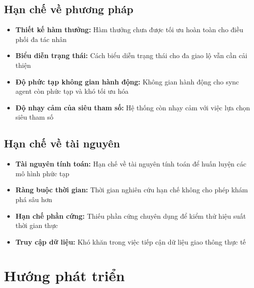 \subsection{Hạn chế về phương pháp}
\begin{itemize}
    \item \textbf{Thiết kế hàm thưởng:} Hàm thưởng chưa được tối ưu hoàn toàn
        cho điều phối đa tác nhân

    \item \textbf{Biểu diễn trạng thái:} Cách biểu diễn trạng thái cho đa giao lộ
        vẫn cần cải thiện

    \item \textbf{Độ phức tạp không gian hành động:} Không gian hành động cho sync agent còn phức
        tạp và khó tối ưu hóa

    \item \textbf{Độ nhạy cảm của siêu tham số:} Hệ thống còn nhạy cảm với việc
        lựa chọn siêu tham số
\end{itemize}

\subsection{Hạn chế về tài nguyên}
\begin{itemize}
    \item \textbf{Tài nguyên tính toán:} Hạn chế về tài nguyên tính toán để
        huấn luyện các mô hình phức tạp

    \item \textbf{Ràng buộc thời gian:} Thời gian nghiên cứu hạn chế không cho phép
        khám phá sâu hơn

    \item \textbf{Hạn chế phần cứng:} Thiếu phần cứng chuyên dụng để kiểm thử hiệu suất thời gian thực

    \item \textbf{Truy cập dữ liệu:} Khó khăn trong việc tiếp cận dữ liệu giao thông
        thực tế
\end{itemize}

\section{Hướng phát triển}

